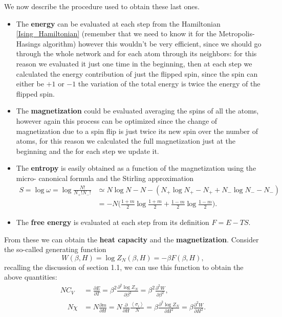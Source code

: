We now describe the procedure used to obtain these last ones.
\begin{itemize}
    \item The \textbf{energy} can be evaluated at each step from the Hamiltonian \eqref{Ising_Hamiltonian} (remember that we need to know it for the Metropolis-Hasings algorithm) however this wouldn't be very efficient, since we should go through the whole network and for each atom through its neighbors: for this reason we evaluated it just one time in the beginning, then at each step we calculated the energy contribution of just the flipped spin, since the spin can either be $+1$ or $-1$ the variation of the total energy is twice the energy of the flipped spin.
    \item The \textbf{magnetization} could be evaluated averaging the spins of all the atoms, however again this process can be optimized since the change of magnetization due to a spin flip is just twice its new spin over the number of atoms, for this reason we calculated the full magnetization just at the beginning and the for each step we update it.
    \item The \textbf{entropy} is easily obtained as a function of the magnetization using the micro-
    canonical formula and the Stirling approximation 
    \begin{align*}
        S=\log\omega=\log\frac{N!}{N_+!N_-!}&\simeq N\log N-N-(N_+\log N_+-N_++N_-\log N_--N_-)\\
        &=-N\bigg(\frac{1+m}{2}\log{\frac{1+m}{2}}+\frac{1-m}{2}\log{\frac{1-m}{2}}\bigg).
    \end{align*} 
    \item The \textbf{free energy} is evaluated at each step from its definition $F=E-TS$. 
\end{itemize}
From these we can obtain the \textbf{heat capacity} and the \textbf{magnetization}. Consider the so-called generating function
\begin{equation}
    W(\beta, H)=\log Z_N(\beta, H)=-\beta F(\beta, H),
\end{equation}
recalling the discussion of section 1.1, we can use this function to obtain the above quantities:
\begin{align*}
    NC_V&=\frac{\partial E}{\partial T}= \beta^2\frac{\partial^2\log Z_N}{\partial\beta^2} =\beta^2\frac{\partial^2 W}{\partial\beta^2},\\\quad N\chi&=N\frac{\partial m}{\partial H}=N\frac{\partial}{\partial H}\frac{\left\langle\sigma_i \right\rangle }{N}=\beta\frac{\partial^2 \log Z_N}{\partial H^2}=\beta\frac{\partial^2 W}{\partial H^2}.
\end{align*}
